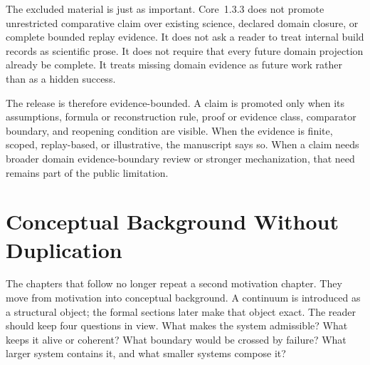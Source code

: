 The excluded material is just as important. Core~1.3.3 does not promote
unrestricted comparative claim over existing science, declared domain closure, or
complete bounded replay evidence. It does not ask a reader to treat internal build
records as scientific prose. It does not require that every future domain
projection already be complete. It treats missing domain evidence as future
work rather than as a hidden success.

The release is therefore evidence-bounded. A claim is promoted only when its
assumptions, formula or reconstruction rule, proof or evidence class,
comparator boundary, and reopening condition are visible. When the evidence is
finite, scoped, replay-based, or illustrative, the manuscript says so. When a
claim needs broader domain evidence-boundary review or stronger mechanization, that need
remains part of the public limitation.

\section{Conceptual Background Without Duplication}
\label{sec:r012-conceptual-background}

The chapters that follow no longer repeat a second motivation chapter. They
move from motivation into conceptual background. A continuum is introduced as a
structural object; the formal sections later make that object exact. The reader
should keep four questions in view. What makes the system admissible? What keeps
it alive or coherent? What boundary would be crossed by failure? What larger
system contains it, and what smaller systems compose it?


